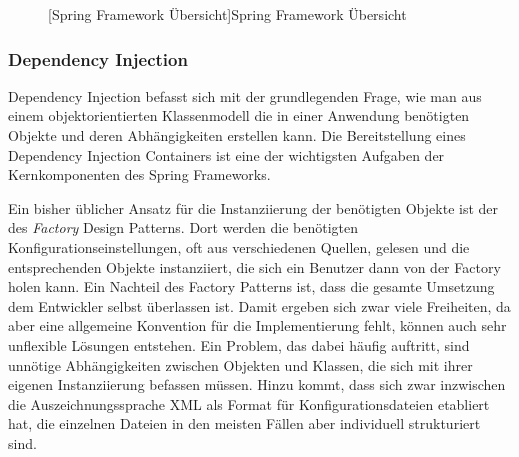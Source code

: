 \begin{figure}[bth]
	[Spring Framework Übersicht]{Spring Framework
	Übersicht\footnotemark}
	\label{ill:springmodules}
\end{figure}

\subsubsection{Dependency Injection}
Dependency Injection befasst sich mit der grundlegenden Frage, wie man aus einem
objektorientierten Klassenmodell die in einer Anwendung benötigten Objekte und
deren Abhängigkeiten erstellen kann. Die Bereitstellung eines Dependency
Injection Containers ist eine der wichtigsten Aufgaben der Kernkomponenten des
Spring Frameworks.

Ein bisher üblicher Ansatz für die Instanziierung der benötigten Objekte ist der
des \emph{Factory} Design Patterns. Dort werden die benötigten
Konfigurationseinstellungen, oft aus verschiedenen Quellen, gelesen und die
entsprechenden Objekte instanziiert, die sich ein Benutzer dann von der Factory
holen kann. Ein Nachteil des Factory Patterns ist, dass die gesamte Umsetzung dem
Entwickler selbst überlassen ist. Damit ergeben sich zwar viele Freiheiten, da
aber eine allgemeine Konvention für die Implementierung fehlt, können auch sehr
unflexible Lösungen entstehen. Ein Problem, das dabei häufig auftritt, sind
unnötige Abhängigkeiten zwischen Objekten und Klassen, die sich mit ihrer eigenen
Instanziierung befassen müssen. Hinzu kommt, dass sich zwar inzwischen die
Auszeichnungssprache \ac{XML} als Format für Konfigurationsdateien etabliert hat,
die einzelnen Dateien in den meisten Fällen aber individuell strukturiert sind.

